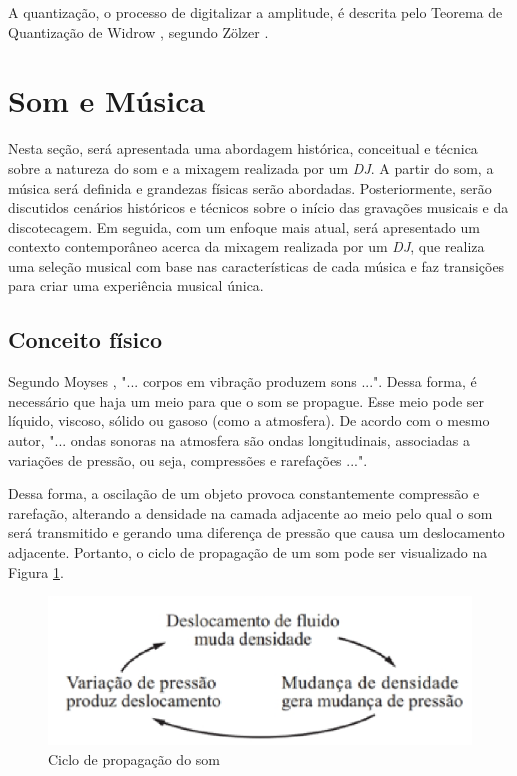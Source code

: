 A quantização, o processo de digitalizar a amplitude, é descrita pelo Teorema de Quantização de Widrow \cite{widrow}, segundo Zölzer \cite{zolzer2008digital}.

\section{Som e Música}
Nesta seção, será apresentada uma abordagem histórica, conceitual e técnica sobre a natureza do som e a mixagem realizada por um \textit{DJ}. A partir do som, a música será definida e grandezas físicas serão abordadas. Posteriormente, serão discutidos cenários históricos e técnicos sobre o início das gravações musicais e da discotecagem. Em seguida, com um enfoque mais atual, será apresentado um contexto contemporâneo acerca da mixagem realizada por um \textit{DJ}, que realiza uma seleção musical com base nas características de cada música e faz transições para criar uma experiência musical única.

\subsection{Conceito físico}
Segundo Moyses \cite{moyses}, "... corpos em vibração produzem sons ...". Dessa forma, é necessário que haja um meio para que o som se propague. Esse meio pode ser líquido, viscoso, sólido ou gasoso (como a atmosfera). De acordo com o mesmo autor, "... ondas sonoras na atmosfera são ondas longitudinais, associadas a variações de pressão, ou seja, compressões e rarefações ...". \par Dessa forma, a oscilação de um objeto provoca constantemente compressão e rarefação, alterando a densidade na camada adjacente ao meio pelo qual o som será transmitido e gerando uma diferença de pressão que causa um deslocamento adjacente. Portanto, o ciclo de propagação de um som pode ser visualizado na Figura \ref{fig07}.

\begin{figure}[h]
	\centering
    \includegraphics[scale=0.7]{figuras/fig07.eps}
	\caption{Ciclo de propagação do som \cite{moyses}}
	\label{fig07}
\end{figure}

